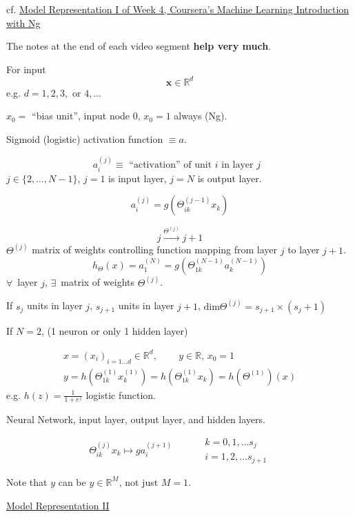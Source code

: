 \documentclass[10pt]{amsart}
\begin{document}
\begin{multicols*}{2}
cf. \href{https://www.coursera.org/learn/machine-learning/supplement/Bln5m/model-representation-i}{Model Representation I of Week 4, Coursera's Machine Learning Introduction with Ng}

The notes at the end of each video segment \textbf{help very much}.

For input
\[
\mathbf{x} \in \mathbb{R}^d
\]
e.g. $d=1,2,3,\text{ or } 4, \dots $

$x_0  = $ ``bias unit'', input node 0, $x_0 =1$ always (Ng).


Sigmoid (logistic) activation function $\equiv a$.

\[
a_i^{(j)} \equiv \text{ ``activation'' of unit $i$ in layer $j$ }
\]
$j \in \lbrace 2, \dots , N-1 \rbrace$, $j=1$ is input layer, $j=N$ is output layer.

\[
a_i^{(j)} = g(\Theta_{ik}^{(j-1)} x_k)
\]

\[
j\xrightarrow{ \Theta^{(j)} } j+1 
\]
$\Theta^{(j)}$ matrix of weights controlling function mapping from layer $j$ to layer $j+1$.
\[
h_{\Theta}(x) = a_1^{(N)} = g(\Theta_{1k}^{(N-1)} a_k^{(N-1)} )
\]
$\forall \, $ layer $j$, $\exists \, $ matrix of weights $\Theta^{(j)}$.

If $s_j$ units in layer $j$, $s_{j+1}$ units in layer $j+1$, $\text{dim}\Theta^{(j)} = s_{j+1} \times (s_j + 1)$


If $N=2$, (1 neuron or only 1 hidden layer)

\[
\begin{gathered}
  x = (x_i)_{i=1 \dots d} \in \mathbb{R}^d, \qquad \, y \in \mathbb{R} , \, x_0 =1 \\ 
 y = h(\Theta_{1k}^{(1)} x_k^{(1)} ) = h(\Theta_{1k}^{(1)}x_k) = h(\Theta^{(1)} )(x)
  \end{gathered}
\]
e.g. $h(z) = \frac{1}{ 1 + e^z} $ logistic function.

Neural Network, input layer, output layer, and hidden layers.

\begin{equation}
  \Theta_{ik}^{(j)}x_k \mapsto g a_i^{(j+1)}   \qquad \, \begin{aligned} & k = 0,1, \dots s_j \\
    & i = 1,2, \dots s_{j+1} \end{aligned}
  \end{equation}

Note that $y$ can be $y \in \mathbb{R}^M$, not just $M=1$.


\href{https://www.coursera.org/learn/machine-learning/supplement/YlEVx/model-representation-ii}{Model Representation II}


\end{multicols*}
\end{document}
